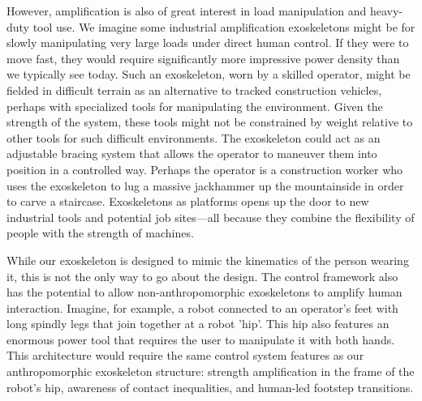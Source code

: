 \documentclass[utf8]{frontiersSCNS}
\renewcommand*{\cite}[1]{\citep{#1}}
\begin{document}
However, amplification is also of great interest in load manipulation and heavy-duty tool use. We imagine some industrial amplification exoskeletons might be for slowly manipulating very large loads under direct human control.
If they were to move fast, they would require significantly more impressive power density than we typically see today.
Such an exoskeleton, worn by a skilled operator, might be fielded in difficult terrain as an alternative to tracked construction vehicles, perhaps with specialized tools for manipulating the environment.
Given the strength of the system, these tools might not be constrained by weight relative to other tools for such difficult environments.
The exoskeleton could act as an adjustable bracing system that allows the operator to maneuver them into position in a controlled way.
Perhaps the operator is a construction worker who uses the exoskeleton to lug a massive jackhammer up the mountainside in order to carve a  staircase.
Exoskeletons as platforms opens up the door to new industrial tools and potential job sites---all because they combine the flexibility of people with the strength of machines.

While our exoskeleton is designed to mimic the kinematics of the person wearing it, this is not the only way to go about the design. The control framework also has the potential to allow non-anthropomorphic exoskeletons to amplify human interaction. Imagine, for example, a robot connected to an operator's feet with long spindly legs that join together at a robot 'hip'. This hip also features an enormous power tool that requires the user to manipulate it with both hands. This architecture would require the same control system features as our anthropomorphic exoskeleton structure: strength amplification in the frame of the robot's hip, awareness of contact inequalities, and human-led footstep transitions.





\end{document}
